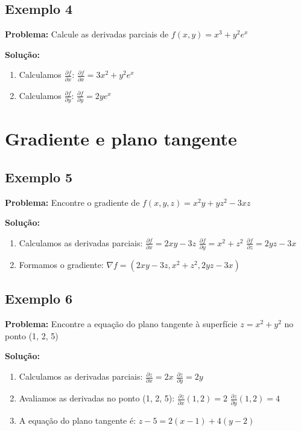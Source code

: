 \subsection{Exemplo 4}
\textbf{Problema:} Calcule as derivadas parciais de $f(x,y) = x^3 + y^2e^x$

\textbf{Solução:}
\begin{enumerate}
\item Calculamos $\frac{\partial f}{\partial x}$:
$\frac{\partial f}{\partial x} = 3x^2 + y^2e^x$
\item Calculamos $\frac{\partial f}{\partial y}$:
$\frac{\partial f}{\partial y} = 2ye^x$
\end{enumerate}

\section{Gradiente e plano tangente}

\subsection{Exemplo 5}
\textbf{Problema:} Encontre o gradiente de $f(x,y,z) = x^2y + yz^2 - 3xz$

\textbf{Solução:}
\begin{enumerate}
\item Calculamos as derivadas parciais:
$\frac{\partial f}{\partial x} = 2xy - 3z$
$\frac{\partial f}{\partial y} = x^2 + z^2$
$\frac{\partial f}{\partial z} = 2yz - 3x$
\item Formamos o gradiente:
$\nabla f = (2xy - 3z, x^2 + z^2, 2yz - 3x)$
\end{enumerate}

\subsection{Exemplo 6}
\textbf{Problema:} Encontre a equação do plano tangente à superfície $z = x^2 + y^2$ no ponto (1, 2, 5)

\textbf{Solução:}
\begin{enumerate}
\item Calculamos as derivadas parciais:
$\frac{\partial z}{\partial x} = 2x$
$\frac{\partial z}{\partial y} = 2y$
\item Avaliamos as derivadas no ponto (1, 2, 5):
$\frac{\partial z}{\partial x}(1,2) = 2$
$\frac{\partial z}{\partial y}(1,2) = 4$
\item A equação do plano tangente é:
$z - 5 = 2(x - 1) + 4(y - 2)$
\end{enumerate}

